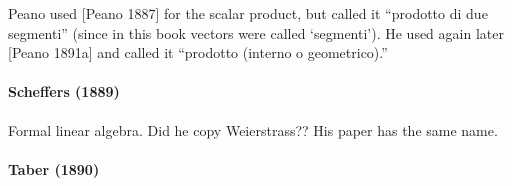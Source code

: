 Peano used [Peano 1887]
for the scalar product, but called it “prodotto di due segmenti” (since in this book vectors
were called ‘segmenti’). He used
again later [Peano 1891a] and called it “prodotto
(interno o geometrico).”



\paragraph{Scheffers (1889)~\cite{Scheffers1889}}

Formal linear algebra. Did he copy Weierstrass?? His paper has the same name.


\paragraph{Taber (1890)~\cite{Taber1890}}

